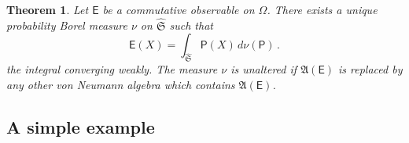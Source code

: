 \documentclass[12pt]{amsart}
\newtheorem{theorem}{Theorem}
\theoremstyle{definition}
\newcommand{\Eo}{\mathsf{E}} %
\newcommand{\PP}{\mathsf{P}} %
\newcommand{\de}{\, d}
\begin{document}
\begin{theorem}\label{th:third}
Let $\Eo$ be a commutative observable on $\Omega$. There exists a unique probability Borel measure $\nu$ on $\widehat{\mathfrak S}$ such that
\begin{equation}\label{commPOVmeas3}
\Eo(X) = \int_{\widehat{\mathfrak S}  } \PP(X )\de \nu (\PP) \, .
\end{equation}
the integral converging weakly. The measure $\nu$ is unaltered if  ${\mathfrak A}  (\Eo)$ is replaced by any other von Neumann algebra which contains ${\mathfrak A}  (\Eo)$.
\end{theorem}

\subsection*{\bf A simple example}
\end{document}
